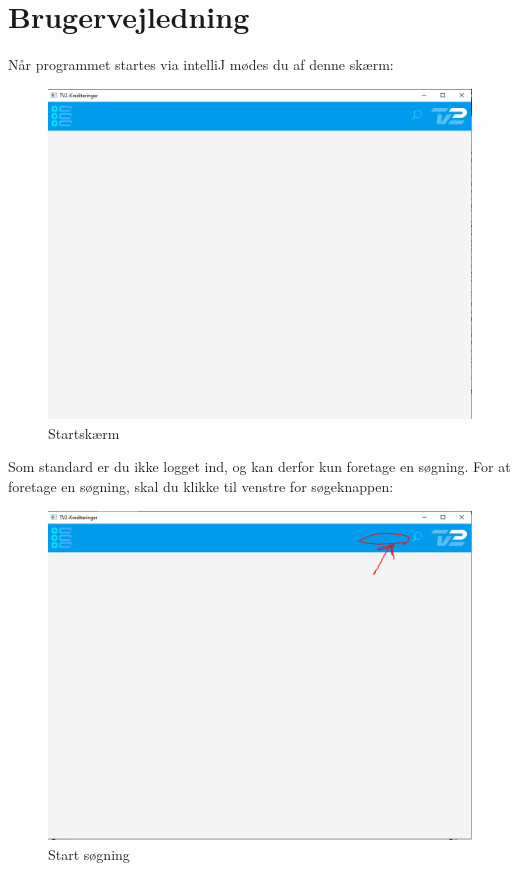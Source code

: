 \section{Brugervejledning}

Når programmet startes via intelliJ mødes du af denne skærm:

\begin{figure}[H]
    \centering
    \includegraphics[scale = 0.5]{images/Home.PNG}
    \caption{Startskærm}
    \label{fig:my_label}
\end{figure}

Som standard er du ikke logget ind, og kan derfor kun foretage en søgning. For at foretage en søgning, skal du klikke til venstre for søgeknappen:

\begin{figure}[H]
    \centering
    \includegraphics[scale = 0.5]{images/StartSearch.PNG}
    \caption{Start søgning}
    \label{fig:my_label}
\end{figure}

